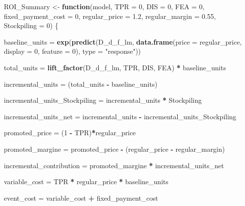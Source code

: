 \documentclass[]{article}
\newenvironment{Shaded}{\begin{snugshade}}{\end{snugshade}}
\newcommand{\ControlFlowTok}[1]{\textcolor[rgb]{0.13,0.29,0.53}{\textbf{#1}}}
\newcommand{\DataTypeTok}[1]{\textcolor[rgb]{0.13,0.29,0.53}{#1}}
\newcommand{\DecValTok}[1]{\textcolor[rgb]{0.00,0.00,0.81}{#1}}
\newcommand{\FloatTok}[1]{\textcolor[rgb]{0.00,0.00,0.81}{#1}}
\newcommand{\KeywordTok}[1]{\textcolor[rgb]{0.13,0.29,0.53}{\textbf{#1}}}
\newcommand{\NormalTok}[1]{#1}
\newcommand{\OperatorTok}[1]{\textcolor[rgb]{0.81,0.36,0.00}{\textbf{#1}}}
\newcommand{\StringTok}[1]{\textcolor[rgb]{0.31,0.60,0.02}{#1}}
\begin{document}
\begin{Shaded}
\begin{Highlighting}[]
\NormalTok{ROI_Summary <-}\StringTok{ }\ControlFlowTok{function}\NormalTok{(model, }\DataTypeTok{TPR =} \DecValTok{0}\NormalTok{, }\DataTypeTok{DIS =} \DecValTok{0}\NormalTok{, }\DataTypeTok{FEA =} \DecValTok{0}\NormalTok{, }\DataTypeTok{fixed_payment_cost =} \DecValTok{0}\NormalTok{, }\DataTypeTok{regular_price =} \FloatTok{1.2}\NormalTok{, }\DataTypeTok{regular_margin =} \FloatTok{0.55}\NormalTok{, }\DataTypeTok{Stockpiling =} \DecValTok{0}\NormalTok{) \{}

\NormalTok{baseline_units =}\StringTok{ }\KeywordTok{exp}\NormalTok{(}\KeywordTok{predict}\NormalTok{(D_d_f_lm, }\KeywordTok{data.frame}\NormalTok{(}\DataTypeTok{price =}\NormalTok{ regular_price, }\DataTypeTok{display =} \DecValTok{0}\NormalTok{, }\DataTypeTok{feature =} \DecValTok{0}\NormalTok{),}
   \DataTypeTok{type =} \StringTok{"response"}\NormalTok{))}

\NormalTok{total_units =}\StringTok{ }\KeywordTok{lift_factor}\NormalTok{(D_d_f_lm, TPR, DIS, FEA) }\OperatorTok{*}\StringTok{ }\NormalTok{baseline_units}

\NormalTok{incremental_units =}\StringTok{ }\NormalTok{(total_units }\OperatorTok{-}\StringTok{ }\NormalTok{baseline_units)}

\NormalTok{incremental_units_Stockpiling =}\StringTok{ }\NormalTok{incremental_units }\OperatorTok{*}\StringTok{ }\NormalTok{Stockpiling}

\NormalTok{incremental_units_net =}\StringTok{ }\NormalTok{incremental_units }\OperatorTok{-}\StringTok{ }\NormalTok{incremental_units_Stockpiling}

\NormalTok{promoted_price =}\StringTok{ }\NormalTok{(}\DecValTok{1} \OperatorTok{-}\StringTok{ }\NormalTok{TPR)}\OperatorTok{*}\NormalTok{regular_price}

\NormalTok{promoted_margine =}\StringTok{ }\NormalTok{promoted_price }\OperatorTok{-}\StringTok{ }\NormalTok{(regular_price }\OperatorTok{-}\StringTok{ }\NormalTok{regular_margin)}

\NormalTok{incremental_contribution =}\StringTok{ }\NormalTok{promoted_margine }\OperatorTok{*}\StringTok{ }\NormalTok{incremental_units_net}
  
\NormalTok{variable_cost =}\StringTok{ }\NormalTok{TPR }\OperatorTok{*}\StringTok{ }\NormalTok{regular_price }\OperatorTok{*}\StringTok{ }\NormalTok{baseline_units}

\NormalTok{event_cost =}\StringTok{ }\NormalTok{variable_cost }\OperatorTok{+}\StringTok{ }\NormalTok{fixed_payment_cost}


\end{Highlighting}
\end{Shaded}
\end{document}
